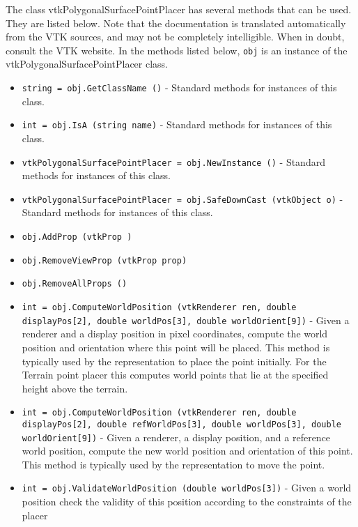 The class vtkPolygonalSurfacePointPlacer has several methods that can be used.
  They are listed below.
Note that the documentation is translated automatically from the VTK sources,
and may not be completely intelligible.  When in doubt, consult the VTK website.
In the methods listed below, \verb|obj| is an instance of the vtkPolygonalSurfacePointPlacer class.
\begin{itemize}
\item  \verb|string = obj.GetClassName ()| -  Standard methods for instances of this class.

\item  \verb|int = obj.IsA (string name)| -  Standard methods for instances of this class.

\item  \verb|vtkPolygonalSurfacePointPlacer = obj.NewInstance ()| -  Standard methods for instances of this class.

\item  \verb|vtkPolygonalSurfacePointPlacer = obj.SafeDownCast (vtkObject o)| -  Standard methods for instances of this class.

\item  \verb|obj.AddProp (vtkProp )|

\item  \verb|obj.RemoveViewProp (vtkProp prop)|

\item  \verb|obj.RemoveAllProps ()|

\item  \verb|int = obj.ComputeWorldPosition (vtkRenderer ren, double displayPos[2], double worldPos[3], double worldOrient[9])| -  Given a renderer and a display position in pixel coordinates,
 compute the world position and orientation where this point
 will be placed. This method is typically used by the
 representation to place the point initially.
 For the Terrain point placer this computes world points that
 lie at the specified height above the terrain.

\item  \verb|int = obj.ComputeWorldPosition (vtkRenderer ren, double displayPos[2], double refWorldPos[3], double worldPos[3], double worldOrient[9])| -  Given a renderer, a display position, and a reference world
 position, compute the new world position and orientation 
 of this point. This method is typically used by the 
 representation to move the point.

\item  \verb|int = obj.ValidateWorldPosition (double worldPos[3])| -  Given a world position check the validity of this 
 position according to the constraints of the placer


\end{itemize}
